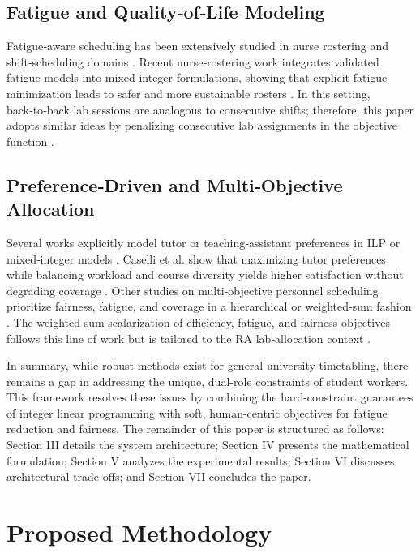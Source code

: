 \documentclass[journal,onecolumn]{IEEEtran}
\begin{document}
\subsection{Fatigue and Quality‑of‑Life Modeling}
Fatigue‑aware scheduling has been extensively studied in nurse rostering and shift‑scheduling domains \cite{fatigue, anderson2018, nurse_fatigue}. Recent nurse‑rostering work integrates validated fatigue models into mixed‑integer formulations, showing that explicit fatigue minimization leads to safer and more sustainable rosters \cite{nurse_fatigue}. In this setting, back‑to‑back lab sessions are analogous to consecutive shifts; therefore, this paper adopts similar ideas by penalizing consecutive lab assignments in the objective function \cite{fatigue, anderson2018}.

\subsection{Preference‑Driven and Multi‑Objective Allocation}
Several works explicitly model tutor or teaching‑assistant preferences in ILP or mixed‑integer models \cite{caselli2022, teaching_assistant_assignment}. Caselli et al. show that maximizing tutor preferences while balancing workload and course diversity yields higher satisfaction without degrading coverage \cite{caselli2022}. Other studies on multi‑objective personnel scheduling prioritize fairness, fatigue, and coverage in a hierarchical or weighted‑sum fashion \cite{multiobjective, weighted_sum, personnel_multiobj}. The weighted‑sum scalarization of efficiency, fatigue, and fairness objectives follows this line of work but is tailored to the RA lab‑allocation context \cite{weighted_sum, multiobjective}.

In summary, while robust methods exist for general university timetabling, there remains a gap in addressing the unique, dual-role constraints of student workers. This framework resolves these issues by combining the hard-constraint guarantees of integer linear programming with soft, human-centric objectives for fatigue reduction and fairness. The remainder of this paper is structured as follows: Section III details the system architecture; Section IV presents the mathematical formulation; Section V analyzes the experimental results; Section VI discusses architectural trade-offs; and Section VII concludes the paper.

\section{Proposed Methodology}
\end{document}
